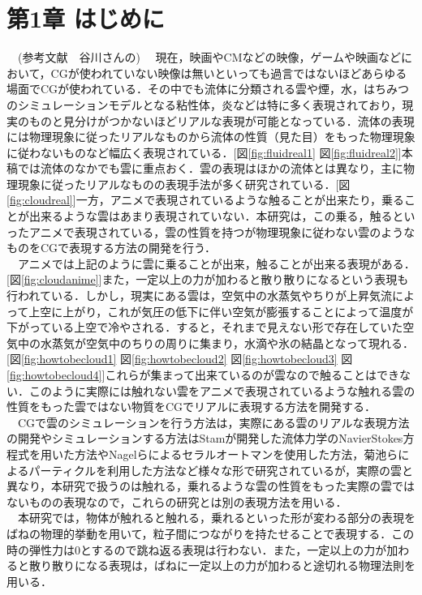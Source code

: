 \documentclass[11pt]{jreport}
\begin{document}
\chapter{第1章 はじめに}
　(参考文献　谷川さんの)
　現在，映画やCMなどの映像，ゲームや映画などにおいて，CGが使われていない映像は無いといっても過言ではないほどあらゆる場面でCGが使われている．その中でも流体に分類される雲や煙，水，はちみつのシミュレーションモデルとなる粘性体，炎などは特に多く表現されており，現実のものと見分けがつかないほどリアルな表現が可能となっている．流体の表現には物理現象に従ったリアルなものから流体の性質（見た目）をもった物理現象に従わないものなど幅広く表現されている．[図\ref{fig:fluidreal1} 図\ref{fig:fluidreal2}]本稿では流体のなかでも雲に重点おく．雲の表現はほかの流体とは異なり，主に物理現象に従ったリアルなものの表現手法が多く研究されている．[図\ref{fig:cloudreal}]一方，アニメで表現されているような触ることが出来たり，乗ることが出来るような雲はあまり表現されていない．本研究は，この乗る，触るといったアニメで表現されている，雲の性質を持つが物理現象に従わない雲のようなものをCGで表現する方法の開発を行う．\\
　アニメでは上記のように雲に乗ることが出来，触ることが出来る表現がある．[図\ref{fig:cloudanime}]また，一定以上の力が加わると散り散りになるという表現も行われている．しかし，現実にある雲は，空気中の水蒸気やちりが上昇気流によって上空に上がり，これが気圧の低下に伴い空気が膨張することによって温度が下がっている上空で冷やされる．すると，それまで見えない形で存在していた空気中の水蒸気が空気中のちりの周りに集まり，水滴や氷の結晶となって現れる．[図\ref{fig:howtobecloud1} 図\ref{fig:howtobecloud2} 図\ref{fig:howtobecloud3} 図\ref{fig:howtobecloud4}]これらが集まって出来ているのが雲なので触ることはできない．このように実際には触れない雲をアニメで表現されているような触れる雲の性質をもった雲ではない物質をCGでリアルに表現する方法を開発する．\\
　CGで雲のシミュレーションを行う方法は，実際にある雲のリアルな表現方法の開発やシミュレーションする方法はStamが開発した流体力学のNavierStokes方程式を用いた方法やNagelらによるセラルオートマンを使用した方法，菊池らによるパーティクルを利用した方法など様々な形で研究されているが，実際の雲と異なり，本研究で扱うのは触れる，乗れるような雲の性質をもった実際の雲ではないものの表現なので，これらの研究とは別の表現方法を用いる．\\
　本研究では，物体が触れると触れる，乗れるといった形が変わる部分の表現をばねの物理的挙動を用いて，粒子間につながりを持たせることで表現する．この時の弾性力は0とするので跳ね返る表現は行わない．また，一定以上の力が加わると散り散りになる表現は，ばねに一定以上の力が加わると途切れる物理法則を用いる．\\
\end{document}
